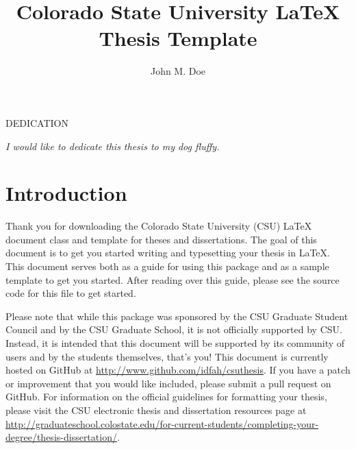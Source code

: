 \documentclass[master]{thesis}
\title{Colorado State University LaTeX Thesis Template}
\author{John M. Doe}
\begin{document}

\frontmatter %

\maketitle
\makemycopyright
\makeabstract
\makeacknowledgements
\tableofcontents
\listoftables %
\listoffigures %

\begin{center}

    DEDICATION

    \vfill %
    \noindent \textit{I would like to dedicate this thesis to my dog fluffy.}
    \vfill
\end{center}
\newpage

\mainmatter %

\chapter{Introduction}
\label{chap:intro}

Thank you for downloading the Colorado State University (CSU) \LaTeX{} document class and template for theses and dissertations.  The goal of this document is to get you started writing and typesetting your thesis in \LaTeX{}.  This document serves both as a guide for using this package and as a sample template to get you started.  After reading over this guide, please see the source code for this file to get started.

Please note that while this package was sponsored by the CSU Graduate Student Council and by the CSU Graduate School, it is not officially supported by CSU.  Instead, it is intended that this document will be supported by its community of users and by the students themselves, that's you!  This document is currently hosted on GitHub at \url{http://www.github.com/idfah/csuthesis}.  If you have a patch or improvement that you would like included, please submit a pull request on GitHub.  For information on the official guidelines for formatting your thesis, please visit the CSU electronic thesis and dissertation resources page at \url{http://graduateschool.colostate.edu/for-current-students/completing-your-degree/thesis-dissertation/}.
\end{document}

